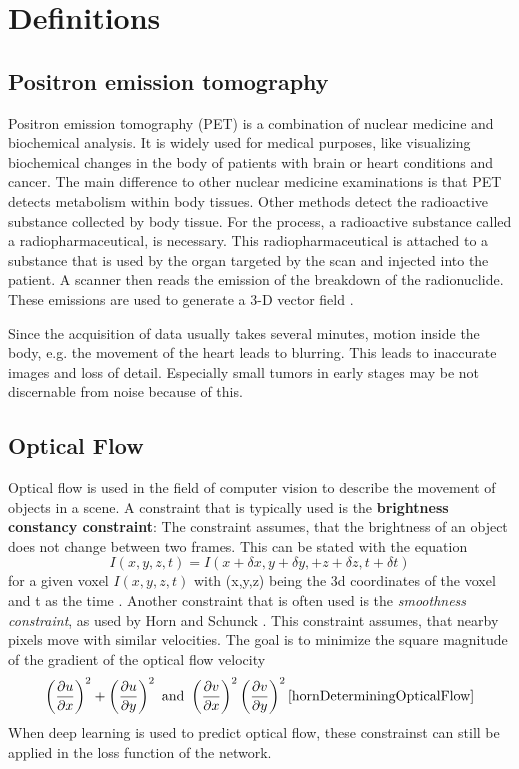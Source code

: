 \chapter{Definitions}
\section{Positron emission tomography}
Positron emission tomography (PET) is a combination of nuclear medicine and biochemical analysis. It is widely used for medical purposes, 
like visualizing biochemical changes in the body of patients with brain or heart conditions and cancer.
The main difference to other nuclear medicine examinations is that PET detects metabolism within body tissues. Other methods detect the 
radioactive substance collected by body tissue. For the process, a radioactive substance called a radiopharmaceutical, is necessary.
This radiopharmaceutical is attached to a substance that is used by the organ targeted by the scan and injected into the patient. A scanner then 
reads the emission of the breakdown of the radionuclide. These emissions are used to generate a 3-D vector field
\cite{PositronEmissionTomography}.

Since the acquisition of data usually takes several minutes, motion inside the body, e.g. the movement of the heart leads to blurring.
This leads to inaccurate images and loss of detail. Especially small tumors in early stages may be not discernable from noise because of this.

\section{Optical Flow}
Optical flow is used in the field of computer vision to describe the movement of objects in a scene. A constraint that is typically used is the \textbf{brightness constancy constraint}: The constraint assumes, that the brightness of an object does not change between two frames. 
This can be stated with the equation
$$ I(x,y,z,t) = I(x + \delta x, y+\delta y, + z + \delta z, t + \delta t)$$ for a given voxel $I(x,y,z,t)$ with (x,y,z) being the 3d coordinates of the voxel and t as the time \cite{dawoodMassConservationbasedOptical2013}.
Another constraint that is often used is the \emph{smoothness constraint}, as used by  Horn and Schunck \cite{hornDeterminingOpticalFlow}. This constraint assumes, that nearby pixels move with similar velocities. The goal is to minimize the square magnitude of the gradient of the optical flow velocity $$\left(\dfrac{\partial u }{\partial x}\right)^2 + \left(\dfrac{\partial u }{\partial y}\right)^2 \text{ and } \left(\dfrac{\partial v }{\partial x}\right)^2 \left(\dfrac{\partial v }{\partial y}\right)^2 \cite{hornDeterminingOpticalFlow}$$
When deep learning is used to predict optical flow, these constrainst can still be applied in the loss function of the network.

